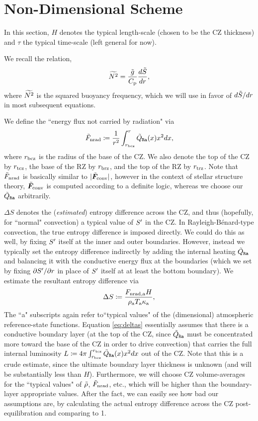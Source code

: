 \documentclass[12pt]{article}
\numberwithin{equation}{section}
\newcommand{\tmpa}{T_{\rm a}}
\newcommand{\rhoa}{\rho_{\rm a}}
\newcommand{\kappaa}{\kappa_{\rm a}}
\newcommand{\fnrada}{F_{\rm{nrad,a}}}
\begin{document}
	\section{Non-Dimensional Scheme}\label{sec:ndscheme}
	In this section, $H$ denotes the typical length-scale (chosen to be the CZ thickness) and $\tau$ the typical time-scale (left general for now). 
	
	We recall the relation,
	\begin{align}\label{eq:nsq}
	\widetilde{N^2} = \frac{\tilde{g}}{C_{\rm{p}}}\frac{d\tilde{S}}{dr},
	\end{align}
	where $\widetilde{N^2}$ is the squared buoyancy frequency, which we will use in favor of $d\tilde{S}/dr$ in most subsequent equations.
	
	We define the ``energy flux not carried by radiation" via
	\begin{align}
		\tilde{F}_{\rm nrad} \coloneqq \frac{1}{r^2}\int_{r_{\rm bcz}}^{r}\tilde{Q}_{\texttt{Ra}}(x)x^2dx,
	\end{align}
	where $r_{\rm bcz}$ is the radius of the base of the CZ. We also denote the top of the CZ by $r_{\rm tcz}$, the base of the RZ by $r_{\rm brz}$, and the top of the RZ by $r_{\rm trz}$. Note that $\tilde{F}_{\rm nrad}$ is basically similar to $|\tilde{\bm{F}}_{\rm conv}|$, however in the context of stellar structure theory, $\tilde{\bm{F}}_{\rm conv}$ is computed according to a definite logic, whereas we choose our $\tilde{Q}_{\texttt{Ra}}$ arbitrarily.
	
	$\Delta S$ denotes the (\textit{estimated}) entropy difference across the CZ, and thus (hopefully, for ``normal" convection) a typical value of ${S^\prime}$ in the CZ. In Rayleigh-B\'enard-type convection, the true entropy difference is imposed directly. We could do this as well, by fixing ${S^\prime}$ itself at the inner and outer boundaries. However, instead we typically set the entropy difference indirectly by adding the internal heating $\tilde{Q}_{\texttt{Ra}}$ and balancing it with the conductive energy flux at the boundaries (which we set by fixing $\partial{S^\prime}/\partial r$ in place of ${S^\prime}$ itself at at least the bottom boundary). We estimate the resultant entropy difference via
	\begin{align}\label{eq:deltas}
		\Delta S \define \frac{\fnrada H}{\rhoa\tmpa\kappaa},
	\end{align}
	The ``a" subscripts again refer to``typical values" of the (dimensional) atmospheric reference-state functions. Equation \eqref{eq:deltas} essentially assumes that there is a conductive boundary layer (at the top of the CZ, since $\tilde{Q}_{\texttt{Ra}}$ must be concentrated more toward the base of the CZ in order to drive convection) that carries the full internal luminosity $L\coloneqq 4\pi \int_{r_{\rm bcz}}^{r_{\rm tcz}}\tilde{Q}_{\texttt{Ra}}(x)x^2dx$ out of the CZ. Note that this is a crude estimate, since the ultimate boundary layer thickness is unknown (and will be substantially less than $H$). Furthermore, we will choose CZ volume-averages for the ``typical values" of $\tilde{\rho}$, $\tilde{F}_{\rm nrad}$, etc., which will be higher than the boundary-layer appropriate values. After the fact, we can easily see how bad our assumptions are, by calculating the actual entropy difference across the CZ post-equilibration and comparing to 1. 
	
\end{document}

